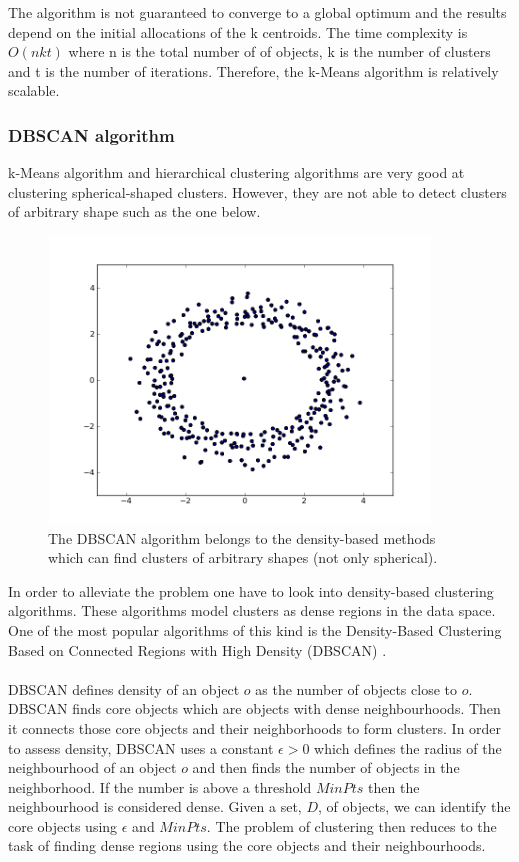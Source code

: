 The algorithm is not guaranteed to converge to a global optimum and the results depend on the initial allocations of the k centroids. The time complexity is $O(nkt)$ where n is the total number of of objects, k is the number of clusters and t is the number of iterations. Therefore, the k-Means algorithm is relatively scalable. 

\subsubsection{DBSCAN algorithm}
k-Means algorithm and hierarchical clustering algorithms are very good at clustering spherical-shaped clusters. However, they are not able to detect clusters of arbitrary shape such as the one below.
\begin{figure}[!htbp]
  \begin{center}
    \includegraphics[height=3in, width=4in]{dbscan-example}
    \caption{The DBSCAN algorithm belongs to the density-based methods which can find clusters of arbitrary shapes (not only spherical).}
    \label{DBSCANExample}
  \end{center}
\end{figure} 
In order to alleviate the problem one have to look into density-based clustering algorithms. These algorithms model clusters as dense regions in the data space. One of the most popular algorithms of this kind is the Density-Based Clustering Based on Connected Regions with High Density (DBSCAN) \citep{han2005}. \\\\ 
DBSCAN defines density of an object $o$ as the number of objects close to $o$. DBSCAN finds core objects which are objects with dense neighbourhoods. Then it connects those core objects and their neighborhoods to form clusters. In order to assess density, DBSCAN uses a constant $\epsilon  > 0$ which defines the radius of the neighbourhood of an object $o$ and then finds the number of objects in the neighborhood. If the number is above a threshold $MinPts$ then the neighbourhood is considered dense. Given a set, $D$, of objects, we can identify the core objects using $\epsilon$ and $MinPts$. The problem of clustering then reduces to the task of finding dense regions using the core objects and their neighbourhoods. \\\\
